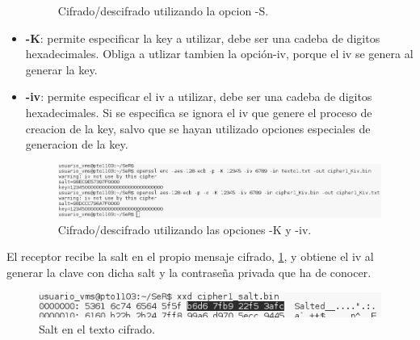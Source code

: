 \documentclass[11pt]{article}
\begin{document}
\begin{itemize}
\begin{figure}[!h]
                \caption{Cifrado/descifrado utilizando la opcion -S.}
              \end{figure}
        \item \textbf{-K}: permite especificar la key a utilizar, debe ser una cadeba de digitos hexadecimales. Obliga a utlizar tambien la opción-iv, porque el iv se genera al generar la key.
        \item \textbf{-iv}: permite especificar el iv a utilizar, debe ser una cadeba de digitos hexadecimales. Si se especifica se ignora el iv que genere el proceso de creacion de la key, salvo que se hayan utilizado opciones especiales de generacion de la key.
              \begin{figure}[!h]
                \centering
                \includegraphics[width = .9\textwidth]{cipher_Kiv}
                \caption{Cifrado/descifrado utilizando las opciones -K y -iv.}
              \end{figure}
      \end{itemize}

      \par
      El receptor recibe la salt en el propio mensaje cifrado, \cref{fig:salt}, y obtiene el iv al generar la clave con dicha salt y la contraseña privada que ha de conocer.
      \begin{figure}[!h]
        \centering
        \includegraphics[width = .9\textwidth]{salt}
        \caption{Salt en el texto cifrado.}
        \label{fig:salt}
      \end{figure}
\end{document}
